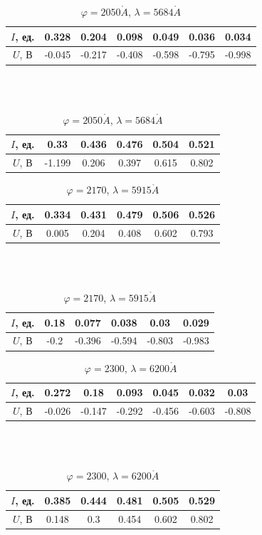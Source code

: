 \documentclass[a4paper, 12pt]{article}
\renewcommand{\phi}{\varphi}
\renewcommand{\AA}{\ensuremath{\mathring{A}}}
\begin{document}
\begin{table}[H]
    \centering
    \begin{tabular}{|c|c|c|c|c|c|c|}
        \hline
        $I$, ед. & 0.328 & 0.204 & 0.098 & 0.049 & 0.036 & 0.034\\ \hline
        $U$, В   & -0.045 & -0.217 & -0.408 & -0.598 & -0.795 & -0.998
        \\ \hline
    \end{tabular}
    \\~\\
    \begin{tabular}{|c|c|c|c|c|c|}
        \hline
        $I$, ед. & 0.33 & 0.436 & 0.476 & 0.504 & 0.521\\ \hline
        $U$, В   & -1.199 & 0.206 & 0.397 & 0.615 & 0.802
        \\ \hline
    \end{tabular}
    \caption {$\phi = 2050 \AA$, $\lambda = 5684 \AA$}
\end{table}

\begin{table}[H]
    \centering
    \begin{tabular}{|c|c|c|c|c|c|}
        \hline
        $I$, ед. & 0.334 & 0.431 & 0.479 & 0.506 & 0.526\\ \hline
        $U$, В   & 0.005 & 0.204 & 0.408 & 0.602 & 0.793
        \\ \hline
    \end{tabular}
    \\~\\
    \begin{tabular}{|c|c|c|c|c|c|}
        \hline
        $I$, ед. & 0.18 & 0.077 & 0.038 & 0.03 & 0.029\\ \hline
        $U$, В   & -0.2 & -0.396 & -0.594 & -0.803 & -0.983
        \\ \hline
    \end{tabular}
    \caption {$\phi = 2170$, $\lambda = 5915 \AA$}
\end{table}

\begin{table}[H]
    \centering
    \begin{tabular}{|c|c|c|c|c|c|c|}
        \hline
        $I$, ед. & 0.272 & 0.18 & 0.093 & 0.045 & 0.032 & 0.03\\ \hline
        $U$, В   & -0.026 & -0.147 & -0.292 & -0.456 & -0.603 & -0.808
        \\ \hline
    \end{tabular}
    \\~\\
    \begin{tabular}{|c|c|c|c|c|c|}
        \hline
        $I$, ед. & 0.385 & 0.444 & 0.481 & 0.505 & 0.529\\ \hline
        $U$, В   & 0.148 & 0.3 & 0.454 & 0.602 & 0.802
        \\ \hline
    \end{tabular}
    \caption {$\phi = 2300$, $\lambda = 6200 \AA$}
\end{table}
\end{document}
